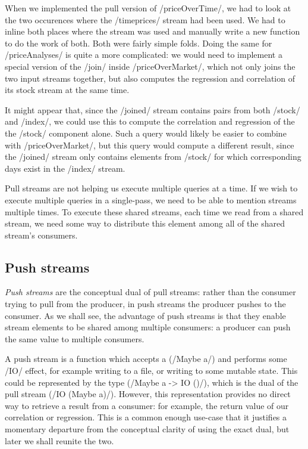 When we implemented the pull version of \Hs/priceOverTime/, we had to look at the two occurences where the \Hs/timeprices/ stream had been used.
We had to inline both places where the stream was used and manually write a new function to do the work of both.
Both were fairly simple folds.
Doing the same for \Hs/priceAnalyses/ is quite a more complicated: we would need to implement a special version of the \Hs/join/ inside \Hs/priceOverMarket/, which not only joins the two input streams together, but also computes the regression and correlation of its stock stream at the same time.

It might appear that, since the \Hs/joined/ stream contains pairs from both \Hs/stock/ and \Hs/index/, we could use this to compute the correlation and regression of the the \Hs/stock/ component alone.
Such a query would likely be easier to combine with \Hs/priceOverMarket/, but this query would compute a different result, since the \Hs/joined/ stream only contains elements from \Hs/stock/ for which corresponding days exist in the \Hs/index/ stream.

Pull streams are not helping us execute multiple queries at a time.
If we wish to execute multiple queries in a single-pass, we need to be able to mention streams multiple times.
To execute these shared streams, each time we read from a shared stream, we need some way to distribute this element among all of the shared stream's consumers.

\subsection{Push streams}

\emph{Push streams} are the conceptual dual of pull streams: rather than the consumer trying to pull from the producer, in push streams the producer pushes to the consumer.
As we shall see, the advantage of push streams is that they enable stream elements to be shared among multiple consumers: a producer can push the same value to multiple consumers.

A push stream is a function which accepts a (\Hs/Maybe a/) and performs some \Hs/IO/ effect, for example writing to a file, or writing to some mutable state.
This could be represented by the type (\Hs/Maybe a -> IO ()/), which is the dual of the pull stream (\Hs/IO (Maybe a)/).
However, this representation provides no direct way to retrieve a result from a consumer: for example, the return value of our correlation or regression.
This is a common enough use-case that it justifies a momentary departure from the conceptual clarity of using the exact dual, but later  we shall reunite the two.

